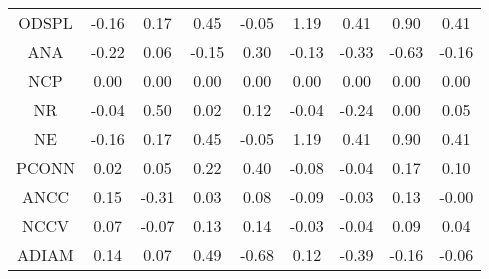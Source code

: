 \documentclass[11pt,a4paper]{report}
\begin{document}
\begin{longtable}{ | c || c | c | c | c | c | c | c || c |}
ODSPL &  \cellcolor[HTML]{FFF7F7} -0.16 &  \cellcolor[HTML]{F7F7FF} 0.17 &  \cellcolor[HTML]{F7F7FF} 0.45 &  \cellcolor[HTML]{FFFFFF} -0.05 &  \cellcolor[HTML]{DFDFFF} 1.19 &  \cellcolor[HTML]{F7F7FF} 0.41 &  \cellcolor[HTML]{E7E7FF} 0.90 &  \cellcolor[HTML]{F7F7FF} 0.41 \\
ANA &  \cellcolor[HTML]{FFF7F7} -0.22 &  \cellcolor[HTML]{FFFFFF} 0.06 &  \cellcolor[HTML]{FFFFFF} -0.15 &  \cellcolor[HTML]{F7F7FF} 0.30 &  \cellcolor[HTML]{FFFFFF} -0.13 &  \cellcolor[HTML]{FFF7F7} -0.33 &  \cellcolor[HTML]{FFEFEF} -0.63 &  \cellcolor[HTML]{FFFFFF} -0.16 \\
NCP &  \cellcolor[HTML]{FFFFFF} 0.00 &  \cellcolor[HTML]{FFFFFF} 0.00 &  \cellcolor[HTML]{FFFFFF} 0.00 &  \cellcolor[HTML]{FFFFFF} 0.00 &  \cellcolor[HTML]{FFFFFF} 0.00 &  \cellcolor[HTML]{FFFFFF} 0.00 &  \cellcolor[HTML]{FFFFFF} 0.00 &  \cellcolor[HTML]{FFFFFF} 0.00 \\
NR &  \cellcolor[HTML]{FFFFFF} -0.04 &  \cellcolor[HTML]{EFEFFF} 0.50 &  \cellcolor[HTML]{FFFFFF} 0.02 &  \cellcolor[HTML]{FFFFFF} 0.12 &  \cellcolor[HTML]{FFFFFF} -0.04 &  \cellcolor[HTML]{FFF7F7} -0.24 &  \cellcolor[HTML]{FFFFFF} 0.00 &  \cellcolor[HTML]{FFFFFF} 0.05 \\
NE &  \cellcolor[HTML]{FFF7F7} -0.16 &  \cellcolor[HTML]{F7F7FF} 0.17 &  \cellcolor[HTML]{F7F7FF} 0.45 &  \cellcolor[HTML]{FFFFFF} -0.05 &  \cellcolor[HTML]{DFDFFF} 1.19 &  \cellcolor[HTML]{F7F7FF} 0.41 &  \cellcolor[HTML]{E7E7FF} 0.90 &  \cellcolor[HTML]{F7F7FF} 0.41 \\
PCONN &  \cellcolor[HTML]{FFFFFF} 0.02 &  \cellcolor[HTML]{FFFFFF} 0.05 &  \cellcolor[HTML]{F7F7FF} 0.22 &  \cellcolor[HTML]{F7F7FF} 0.40 &  \cellcolor[HTML]{FFFFFF} -0.08 &  \cellcolor[HTML]{FFFFFF} -0.04 &  \cellcolor[HTML]{F7F7FF} 0.17 &  \cellcolor[HTML]{FFFFFF} 0.10 \\
ANCC &  \cellcolor[HTML]{FFFFFF} 0.15 &  \cellcolor[HTML]{FFF7F7} -0.31 &  \cellcolor[HTML]{FFFFFF} 0.03 &  \cellcolor[HTML]{FFFFFF} 0.08 &  \cellcolor[HTML]{FFFFFF} -0.09 &  \cellcolor[HTML]{FFFFFF} -0.03 &  \cellcolor[HTML]{FFFFFF} 0.13 &  \cellcolor[HTML]{FFFFFF} -0.00 \\
NCCV &  \cellcolor[HTML]{FFFFFF} 0.07 &  \cellcolor[HTML]{FFFFFF} -0.07 &  \cellcolor[HTML]{FFFFFF} 0.13 &  \cellcolor[HTML]{FFFFFF} 0.14 &  \cellcolor[HTML]{FFFFFF} -0.03 &  \cellcolor[HTML]{FFFFFF} -0.04 &  \cellcolor[HTML]{FFFFFF} 0.09 &  \cellcolor[HTML]{FFFFFF} 0.04 \\
ADIAM &  \cellcolor[HTML]{FFFFFF} 0.14 &  \cellcolor[HTML]{FFFFFF} 0.07 &  \cellcolor[HTML]{EFEFFF} 0.49 &  \cellcolor[HTML]{FFEFEF} -0.68 &  \cellcolor[HTML]{FFFFFF} 0.12 &  \cellcolor[HTML]{FFF7F7} -0.39 &  \cellcolor[HTML]{FFF7F7} -0.16 &  \cellcolor[HTML]{FFFFFF} -0.06 \\

\end{longtable}
\end{document}
